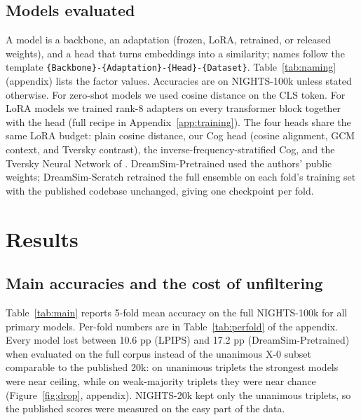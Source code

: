 \documentclass{article}
\begin{document}
\subsection{Models evaluated}

A model is a backbone, an adaptation (frozen, LoRA, retrained, or released weights), and a head that turns embeddings into a similarity; names follow the template \texttt{\{Backbone\}-\{Adaptation\}-\{Head\}-\{Dataset\}}. Table~\ref{tab:naming} (appendix) lists the factor values. Accuracies are on NIGHTS-100k unless stated otherwise. For zero-shot models we used cosine distance on the CLS token. For LoRA models we trained rank-8 adapters on every transformer block together with the head (full recipe in Appendix~\ref{app:training}). The four heads share the same LoRA budget: plain cosine distance, our Cog head (cosine alignment, GCM context, and Tversky contrast), the inverse-frequency-stratified Cog, and the Tversky Neural Network of \citet{doumbouya2025tversky}. DreamSim-Pretrained used the authors' public weights; DreamSim-Scratch retrained the full ensemble on each fold's training set with the published codebase unchanged, giving one checkpoint per fold.

\section{Results}

\subsection{Main accuracies and the cost of unfiltering}

Table~\ref{tab:main} reports 5-fold mean accuracy on the full NIGHTS-100k for all primary models. Per-fold numbers are in Table~\ref{tab:perfold} of the appendix. Every model lost between 10.6 pp (LPIPS) and 17.2 pp (DreamSim-Pretrained) when evaluated on the full corpus instead of the unanimous X-0 subset comparable to the published 20k: on unanimous triplets the strongest models were near ceiling, while on weak-majority triplets they were near chance (Figure~\ref{fig:drop}, appendix). NIGHTS-20k kept only the unanimous triplets, so the published scores were measured on the easy part of the data.
\end{document}
